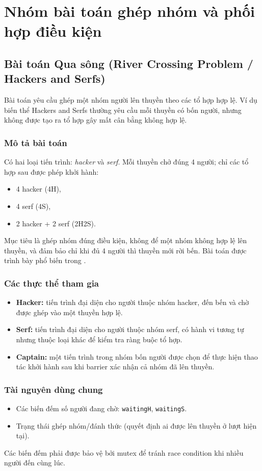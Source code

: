 \chapter{Nhóm bài toán ghép nhóm và phối hợp điều kiện}

\section{Bài toán Qua sông (River Crossing Problem / Hackers and Serfs)}

Bài toán yêu cầu ghép một nhóm người lên thuyền theo các tổ hợp hợp lệ. Ví dụ biến thể Hackers and Serfs thường yêu cầu mỗi thuyền có bốn người, nhưng không được tạo ra tổ hợp gây mất cân bằng không hợp lệ.

\subsection{Mô tả bài toán}
Có hai loại tiến trình: \textit{hacker} và \textit{serf}. Mỗi thuyền chở đúng 4 người; chỉ các tổ hợp sau được phép khởi hành:
\begin{itemize}
    \item 4 hacker (4H),
    \item 4 serf (4S),
    \item 2 hacker + 2 serf (2H2S).
\end{itemize}
Mục tiêu là ghép nhóm đúng điều kiện, không để một nhóm không hợp lệ lên thuyền, và đảm bảo chỉ khi đủ 4 người thì thuyền mới rời bến. Bài toán được trình bày phổ biến trong \cite{downey2016}.

\subsection{Các thực thể tham gia}
\begin{itemize}
    \item \textbf{Hacker:} tiến trình đại diện cho người thuộc nhóm hacker, đến bến và chờ được ghép vào một thuyền hợp lệ.
    \item \textbf{Serf:} tiến trình đại diện cho người thuộc nhóm serf, có hành vi tương tự nhưng thuộc loại khác để kiểm tra ràng buộc tổ hợp.
    \item \textbf{Captain:} một tiến trình trong nhóm bốn người được chọn để thực hiện thao tác khởi hành sau khi barrier xác nhận cả nhóm đã lên thuyền.
\end{itemize}

\subsection{Tài nguyên dùng chung}
\begin{itemize}
    \item Các biến đếm số người đang chờ: \texttt{waitingH}, \texttt{waitingS}.
    \item Trạng thái ghép nhóm/đánh thức (quyết định ai được lên thuyền ở lượt hiện tại).
\end{itemize}
Các biến đếm phải được bảo vệ bởi mutex để tránh race condition khi nhiều người đến cùng lúc.

